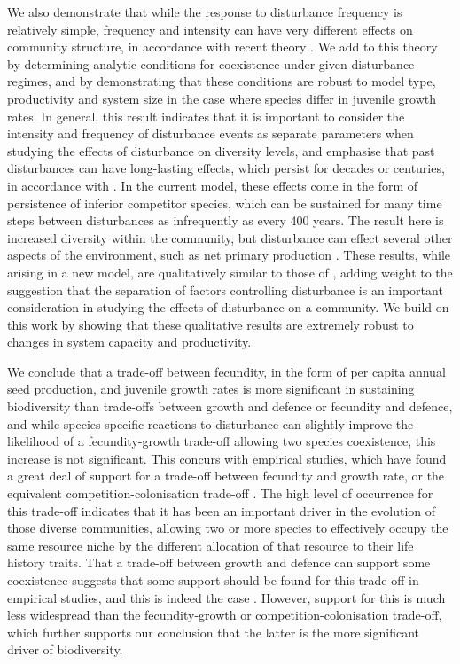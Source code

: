 \documentclass[a4paper]{article}
\begin{document}
We also demonstrate that while the response to disturbance frequency is relatively simple, frequency and intensity can have very different effects on community structure, in accordance with recent theory \citep{miller2011frequency}. We add to this theory by determining analytic conditions for coexistence under given disturbance regimes, and by demonstrating that these conditions are robust to model type, productivity and system size in the case where species differ in juvenile growth rates. In general, this result indicates that it is important to consider the intensity and frequency of disturbance events as separate parameters when studying the effects of disturbance on diversity levels, and emphasise that past disturbances can have long-lasting effects, which persist for decades or centuries, in accordance with \cite{foster1999human}. In the current model, these effects come in the form of persistence of inferior competitor species, which can be sustained for many time steps between disturbances as infrequently as every 400 years. The result here is increased diversity within the community, but disturbance can effect several other aspects of the environment, such as net primary production \citep[e.g.][]{turner2010disturbance}. These results, while arising in a new model, are qualitatively similar to those of \cite{miller2011frequency}, adding weight to the suggestion that the separation of factors controlling disturbance is an important consideration in studying the effects of disturbance on a community. We build on this work by showing that these qualitative results are extremely robust to changes in system capacity and productivity.


We conclude that a trade-off between fecundity, in the form of per capita annual seed production, and juvenile growth rates is more significant in sustaining biodiversity than trade-offs between growth and defence or fecundity and defence, and while species specific reactions to disturbance can slightly improve the likelihood of a fecundity-growth trade-off allowing two species coexistence, this increase is not significant. This concurs with empirical studies, which have found a great deal of support for a trade-off between fecundity and growth rate, or the equivalent competition-colonisation trade-off \citep[e.g.][]{levins1971regional,yu2001competition,tilman1994competition,adler2000space}. The high level of occurrence for this trade-off indicates that it has been an important driver in the evolution of those diverse communities, allowing two or more species to effectively occupy the same resource niche by the different allocation of that resource to their life history traits. That a trade-off between growth and defence can support some coexistence suggests that some support should be found for this trade-off in empirical studies, and this is indeed the case \citep[e.g.][]{wright2010functional,fine2006growth}. However, support for this is much less widespread than the fecundity-growth or competition-colonisation trade-off, which further supports our conclusion that the latter is the more significant driver of biodiversity.
\end{document}
